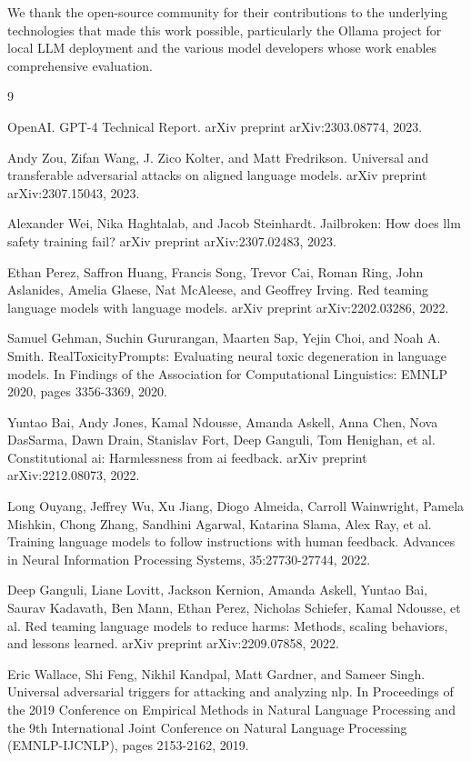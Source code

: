 \documentclass[11pt,twocolumn]{article}
\begin{document}
We thank the open-source community for their contributions to the underlying technologies that made this work possible, particularly the Ollama project for local LLM deployment and the various model developers whose work enables comprehensive evaluation.

\begin{thebibliography}{9}

OpenAI. GPT-4 Technical Report. arXiv preprint arXiv:2303.08774, 2023.

Andy Zou, Zifan Wang, J. Zico Kolter, and Matt Fredrikson. Universal and transferable adversarial attacks on aligned language models. arXiv preprint arXiv:2307.15043, 2023.

Alexander Wei, Nika Haghtalab, and Jacob Steinhardt. Jailbroken: How does llm safety training fail? arXiv preprint arXiv:2307.02483, 2023.

Ethan Perez, Saffron Huang, Francis Song, Trevor Cai, Roman Ring, John Aslanides, Amelia Glaese, Nat McAleese, and Geoffrey Irving. Red teaming language models with language models. arXiv preprint arXiv:2202.03286, 2022.

Samuel Gehman, Suchin Gururangan, Maarten Sap, Yejin Choi, and Noah A. Smith. RealToxicityPrompts: Evaluating neural toxic degeneration in language models. In Findings of the Association for Computational Linguistics: EMNLP 2020, pages 3356-3369, 2020.

Yuntao Bai, Andy Jones, Kamal Ndousse, Amanda Askell, Anna Chen, Nova DasSarma, Dawn Drain, Stanislav Fort, Deep Ganguli, Tom Henighan, et al. Constitutional ai: Harmlessness from ai feedback. arXiv preprint arXiv:2212.08073, 2022.

Long Ouyang, Jeffrey Wu, Xu Jiang, Diogo Almeida, Carroll Wainwright, Pamela Mishkin, Chong Zhang, Sandhini Agarwal, Katarina Slama, Alex Ray, et al. Training language models to follow instructions with human feedback. Advances in Neural Information Processing Systems, 35:27730-27744, 2022.

Deep Ganguli, Liane Lovitt, Jackson Kernion, Amanda Askell, Yuntao Bai, Saurav Kadavath, Ben Mann, Ethan Perez, Nicholas Schiefer, Kamal Ndousse, et al. Red teaming language models to reduce harms: Methods, scaling behaviors, and lessons learned. arXiv preprint arXiv:2209.07858, 2022.

Eric Wallace, Shi Feng, Nikhil Kandpal, Matt Gardner, and Sameer Singh. Universal adversarial triggers for attacking and analyzing nlp. In Proceedings of the 2019 Conference on Empirical Methods in Natural Language Processing and the 9th International Joint Conference on Natural Language Processing (EMNLP-IJCNLP), pages 2153-2162, 2019.

\end{thebibliography}
\end{document}
